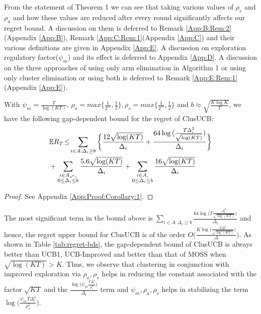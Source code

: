 From the statement of Theorem 1 we can see that taking various values of $\rho_{s}$ and $\rho_{a}$ and how these values are reduced after every round significantly affects our regret bound. A discussion on them is deferred to Remark \ref{App:B:Rem:2}(Appendix \ref{App:B}), Remark \ref{App:C:Rem:1}(Appendix \ref{App:C}) and their various definitions are given in Appendix \ref{App:E}. A discussion on exploration regulatory factor($\psi_{m}$) and its effect is deferred to Appendix \ref{App:D}. A discussion on the three approaches of using only arm elimination in Algorithm 1 or using only cluster elimination or using both is deferred to Remark \ref{App:E:Rem:1}(Appendix \ref{App:E}).

\begin{corollary}
\label{Result:Corollary:1}
With $\psi_{m}=\frac{T}{\log (KT)}$, $\rho_{a}=max\bigg\lbrace\frac{1}{2^{m}},\frac{1}{2}\bigg\rbrace,\rho_{s}=max\bigg\lbrace\frac{1}{2^{m}},\frac{1}{2}\bigg\rbrace $ and $b\approx\sqrt{\frac{K\log K}{T}}$,  we have the following gap-dependent bound for the regret of ClusUCB:
\begin{align*}
&\mathbb{E} R_T \!\le\! \sum_{i\in A:\Delta_{i}\geq b}\bigg\lbrace\dfrac{12\sqrt{\log (KT)}}{\Delta_{i}}  + \dfrac{64\log{(\frac{T\Delta_{i}^{2}}{\sqrt{\log (KT)}})}}{\Delta_{i}}\bigg\rbrace \\
&+ \sum\limits_{\substack{i\in A_{s^{*}},\\0\leq\Delta_{i}\leq b}}\dfrac{5.6\sqrt{\log (KT)}}{\Delta_{i}} + \sum\limits_{\substack{i\in A,\\0\leq\Delta_{i}\leq b}}\dfrac{16\sqrt{\log (KT)}}{\Delta_{i}} 
\end{align*}
\end{corollary}
\begin{proof}
 See Appendix \ref{App:Proof:Corollary:1}.
\end{proof}

The most significant term in the bound above is $\sum_{i\in A:\Delta_{i}\geq b}\frac{64\log{\big(T\frac{\Delta_{i}^{2}}{\sqrt{\log (KT)}}\big)}}{\Delta_{i}}$ and hence, the regret upper bound for ClusUCB is of the order $O\bigg(\frac{K\log \big(\frac{T\Delta^{2}}{\sqrt{\log (KT)}}\big)}{\Delta}\bigg)$. As shown in Table \ref{tab:regret-bds}, the gap-dependent bound of ClusUCB is always better than UCB1, UCB-Improved and better than that of MOSS when $\sqrt{\log(KT)}>K$.  Thus, we observe that clustering in conjunction with improved exploration via $\rho_{a},\rho_{s}$ helps in reducing the constant associated with the factor $\sqrt{KT}$ and the $\frac{\log\bigg(\psi_{m}\frac{T\Delta_{i}^{4}}{\rho_{s}^{2}}\bigg)}{\Delta_{i}}$ 
term and $\psi_{m},\rho_{a},\rho_{s}$ helps in stabilizing the term $\log\bigg(\frac{\psi_{m}T\Delta_{i}^{4}}{\rho_{s}^{2}}\bigg)$.

